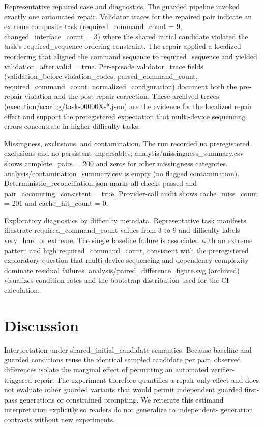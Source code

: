 \documentclass[conference]{IEEEtran}
\begin{document}
Representative repaired case and diagnostics. The guarded pipeline invoked exactly one automated repair. Validator traces for the repaired pair indicate an extreme composite task (required\_command\_count = 9, changed\_interface\_count = 3) where the shared initial candidate violated the task's required\_sequence ordering constraint. The repair applied a localized reordering that aligned the command sequence to required\_sequence and yielded validation\_after.valid = true. Per-episode validator\_trace fields (validation\_before.violation\_codes, parsed\_command\_count, required\_command\_count, normalized\_configuration) document both the pre-repair violation and the post-repair correction. These archived traces (execution/scoring/task-00000X-*.json) are the evidence for the localized repair effect and support the preregistered expectation that multi-device sequencing errors concentrate in higher-difficulty tasks.

Missingness, exclusions, and contamination. The run recorded no preregistered exclusions and no persistent unparsables; analysis/missingness\_summary.csv shows complete\_pairs = 200 and zeros for other missingness categories. analysis/contamination\_summary.csv is empty (no flagged contamination). Deterministic\_reconciliation.json marks all checks passed and pair\_accounting\_consistent = true. Provider-call audit shows cache\_miss\_count = 201 and cache\_hit\_count = 0.

Exploratory diagnostics by difficulty metadata. Representative task manifests illustrate required\_command\_count values from 3 to 9 and difficulty labels very\_hard or extreme. The single baseline failure is associated with an extreme pattern and high required\_command\_count, consistent with the preregistered exploratory question that multi-device sequencing and dependency complexity dominate residual failures. analysis/paired\_difference\_figure.svg (archived) visualizes condition rates and the bootstrap distribution used for the CI calculation.

\section{Discussion}
Interpretation under shared\_initial\_candidate semantics. Because baseline and guarded conditions reuse the identical sampled candidate per pair, observed differences isolate the marginal effect of permitting an automated verifier-triggered repair. The experiment therefore quantifies a repair-only effect and does not evaluate other guarded variants that would permit independent guarded first-pass generations or constrained prompting. We reiterate this estimand interpretation explicitly so readers do not generalize to independent- generation contrasts without new experiments.
\end{document}
